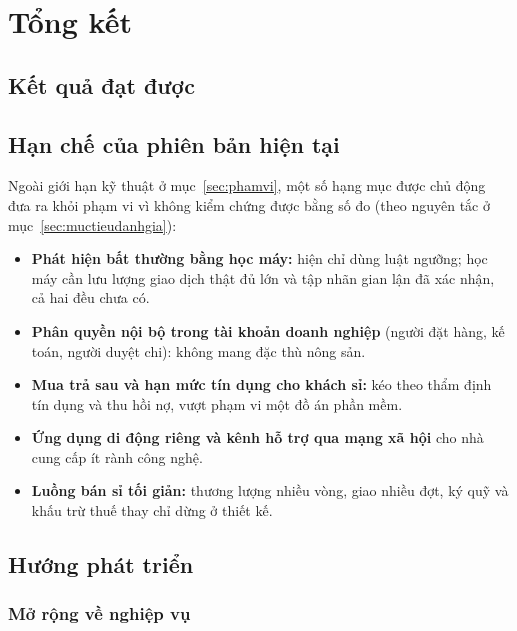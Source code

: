 \chapter{Tổng kết}
\label{chap:ketluan}

\section{Kết quả đạt được}

\section{Hạn chế của phiên bản hiện tại}

Ngoài giới hạn kỹ thuật ở mục~\ref{sec:phamvi}, một số hạng mục được chủ động đưa ra khỏi phạm vi vì không kiểm chứng được bằng số đo (theo nguyên tắc ở mục~\ref{sec:muctieudanhgia}):
\begin{itemize}
    \item \textbf{Phát hiện bất thường bằng học máy:} hiện chỉ dùng luật ngưỡng; học máy cần lưu lượng giao dịch thật đủ lớn và tập nhãn gian lận đã xác nhận, cả hai đều chưa có.
    \item \textbf{Phân quyền nội bộ trong tài khoản doanh nghiệp} (người đặt hàng, kế toán, người duyệt chi): không mang đặc thù nông sản.
    \item \textbf{Mua trả sau và hạn mức tín dụng cho khách sỉ:} kéo theo thẩm định tín dụng và thu hồi nợ, vượt phạm vi một đồ án phần mềm.
    \item \textbf{Ứng dụng di động riêng và kênh hỗ trợ qua mạng xã hội} cho nhà cung cấp ít rành công nghệ.
    \item \textbf{Luồng bán sỉ tối giản:} thương lượng nhiều vòng, giao nhiều đợt, ký quỹ và khấu trừ thuế thay chỉ dừng ở thiết kế.
\end{itemize}

\section{Hướng phát triển}

\subsection{Mở rộng về nghiệp vụ}

